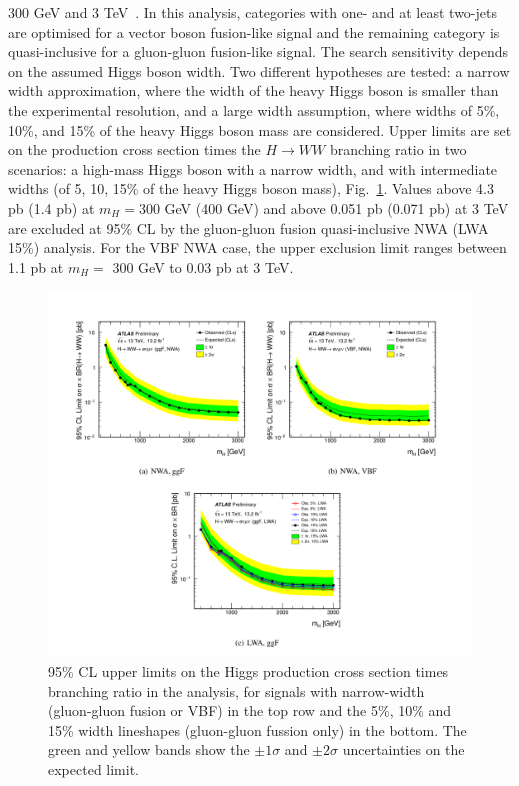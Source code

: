 300 GeV and 3 TeV~\cite{ATLAS-CONF-2016-074}. In this analysis, categories with one- and at least two-jets
are optimised for a vector boson fusion-like signal and the remaining category is quasi-inclusive
for a gluon-gluon fusion-like signal. The search sensitivity depends on the assumed Higgs boson width. Two different hypotheses are tested:
a narrow width approximation, where the width of the heavy Higgs boson is smaller than the
experimental resolution, and a large width assumption, where widths of 5\%, 10\%, and 15\% of
the heavy Higgs boson mass are considered.
Upper limits are set on  the production cross section times the $H \to WW$ branching ratio in two scenarios:
a high-mass Higgs boson with a narrow width, and  with intermediate widths (of 5, 10, 15\% of the
heavy Higgs boson mass), Fig.~\ref{ATLAS-CONF-2016-074_fig}. Values above 4.3 pb (1.4 pb) at $m_H=$300 GeV (400 GeV) and above 0.051 pb
(0.071 pb) at 3 TeV are excluded at 95\% CL by the gluon-gluon fusion quasi-inclusive NWA (LWA 15\%) analysis. For
the VBF NWA case, the upper exclusion limit ranges between 1.1 pb at $m_H=$ 300 GeV to 0.03 pb at 3 TeV.

\begin{figure}
\includegraphics[scale= 0.9]{../Cap1/ATLAS-CONF-2016-074}
\caption{95\% CL upper limits on the Higgs production cross section times branching ratio in the analysis, for signals with narrow-width (gluon-gluon fusion or VBF) in the top row and the 5\%, 10\% and 15\% width lineshapes (gluon-gluon fussion only) in the bottom. The green and yellow bands show the  $\pm 1\sigma$ and  $\pm 2\sigma$ uncertainties on the expected limit. }
\label{ATLAS-CONF-2016-074_fig}
\end{figure}
